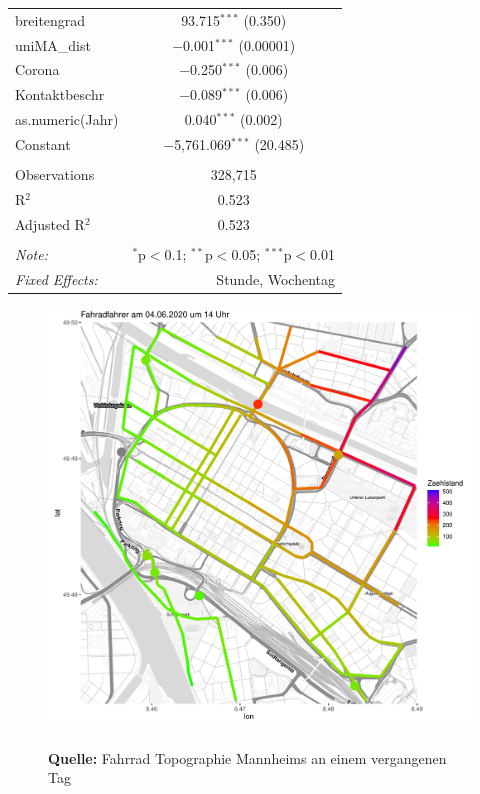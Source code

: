 \documentclass[a4paper,12pt]{thesis}
\newcommand*{\captionsource}[2]{%
	\caption[{#1}]{%
		#1%
		\\\hspace{\linewidth}%
		\textbf{Quelle:} #2%
	}%
}
\begin{document}
\begin{table}[!htbp]
\begin{tabular}{@{\extracolsep{-15pt}}lc}
		breitengrad & 93.715$^{***}$ (0.350) \\ 
		uniMA\_dist & $-$0.001$^{***}$ (0.00001) \\ 
		Corona & $-$0.250$^{***}$ (0.006) \\ 
		Kontaktbeschr & $-$0.089$^{***}$ (0.006) \\ 
		as.numeric(Jahr) & 0.040$^{***}$ (0.002) \\ 
		Constant & $-$5,761.069$^{***}$ (20.485) \\ 
		\hline \\[-1.8ex] 
		Observations & 328,715 \\ 
		R$^{2}$ & 0.523 \\ 
		Adjusted R$^{2}$ & 0.523 \\ 
		\hline 
		\hline \\[-1.8ex] 
		\textit{Note:}  & \multicolumn{1}{r}{$^{*}$p$<$0.1; $^{**}$p$<$0.05; $^{***}$p$<$0.01} \\ 
		\textit{Fixed Effects:}  & \multicolumn{1}{r}{Stunde, Wochentag} \\
	\end{tabular} 
\end{table} 

\begin{figure}[!ht]
	\centering
	\includegraphics[width=\textwidth]{Plots/HeatmapFinal1.pdf}
	\captionsource{}{
		Fahrrad Topographie Mannheims an einem vergangenen Tag
	}
	\label{Topography1}
\end{figure}
\end{document}
